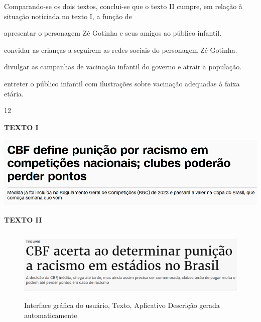 Comparando-se os dois textos, conclui-se que o texto II cumpre, em
relação à situação noticiada no texto I, a função de

\begin{escolha}
\item apresentar o personagem Zé Gotinha e seus amigos ao público infantil.

\item convidar as crianças a seguirem as redes sociais do personagem Zé
Gotinha.

\item divulgar as campanhas de vacinação infantil do governo e atrair a
população.

\item entreter o público infantil com ilustrações sobre vacinação adequadas
à faixa etária.
\end{escolha}

\num{12}

\textbf{TEXTO I}

\includegraphics[width=5.34306in,height=1.37786in]{./imgSAEB_8_POR/media/image33.png}


\textbf{TEXTO II}

\begin{figure}
\centering
\includegraphics[width=5.47847in,height=1.37348in]{./imgSAEB_8_POR/media/image34.png}
\caption{Interface gráfica do usuário, Texto, Aplicativo Descrição
gerada automaticamente}
\end{figure}


